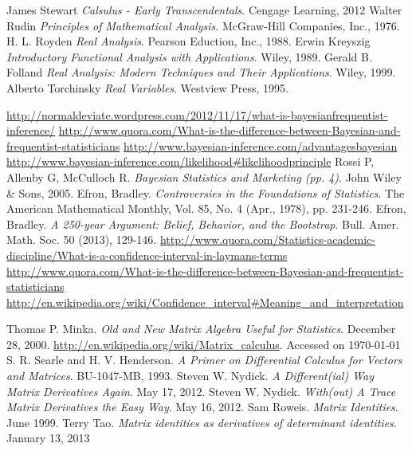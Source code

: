 \documentclass{book}
\begin{document}
\begin{thebibliography}{100} %
 James Stewart {\em{Calsulus - Early Transcendentals}}. Cengage Learning, 2012
 Walter Rudin {\em{Principles of Mathematical Analysis}}. McGraw-Hill Companies, Inc., 1976.
 H. L. Royden {\em{Real Analysis}}. Pearson Eduction, Inc., 1988.
 Erwin Kreyszig {\em{Introductory Functional Analysis with Applications}}. Wiley, 1989.
 Gerald B. Folland {\em{Real Analysis: Modern Techniques and Their Applications}}. Wiley, 1999.
 Alberto Torchinsky {\em{Real Variables}}. Westview Press, 1995.

 {\url{http://normaldeviate.wordpress.com/2012/11/17/what-is-bayesianfrequentist-inference/}}
 {\url{http://www.quora.com/What-is-the-difference-between-Bayesian-and-frequentist-statisticians}}
 {\url{http://www.bayesian-inference.com/advantagesbayesian}}
 {\url{http://www.bayesian-inference.com/likelihood#likelihoodprinciple}}
 Rossi P, Allenby G, McCulloch R. {\emph{Bayesian Statistics and Marketing (pp. 4)}}. John Wiley \& Sons, 2005.
 Efron, Bradley. {\emph{Controversies in the Foundations of Statistics}}. The American Mathematical Monthly, Vol. 85, No. 4 (Apr., 1978), pp. 231-246.
 Efron, Bradley. {\emph{A 250-year Argument: Belief, Behavior, and the Bootstrap}}. Bull. Amer. Math. Soc. 50 (2013), 129-146.
 {\url{http://www.quora.com/Statistics-academic-discipline/What-is-a-confidence-interval-in-laymans-terms}}
 {\url{http://www.quora.com/What-is-the-difference-between-Bayesian-and-frequentist-statisticians}}
 {\url{http://en.wikipedia.org/wiki/Confidence_interval#Meaning_and_interpretation}}

 Thomas P. Minka. {\em{Old and New Matrix Algebra Useful for Statistics}}. December 28, 2000.
 \url{http://en.wikipedia.org/wiki/Matrix_calculus}. Accessed on \today
{} S. R. Searle and H. V. Henderson. {\em{A Primer on Differential Calculus for Vectors and Matrices}}. BU-1047-MB, 1993.
 Steven W. Nydick. {\em{A Different(ial) Way Matrix Derivatives Again}}. May 17, 2012.
 Steven W. Nydick. {\em{With(out) A Trace Matrix Derivatives the Easy Way}}. May 16, 2012.
 Sam Roweis. {\em{Matrix Identities}}. June 1999.
 Terry Tao. {\em{Matrix identities as derivatives of determinant identities}}. January 13, 2013
\end{thebibliography}

\printindex
\end{document}
